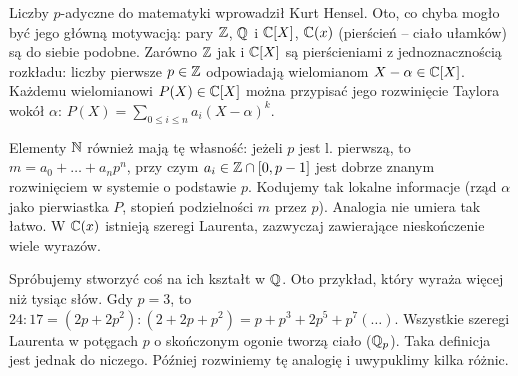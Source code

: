 



Liczby $p$-adyczne do matematyki wprowadził Kurt Hensel.
Oto, co chyba mogło być jego główną motywacją: pary $\mathbb Z$, $\mathbb Q$ i $\mathbb C[X]$, $\mathbb C(x)$ (pierścień -- ciało ułamków) są do siebie podobne.
Zarówno $\mathbb Z$ jak i $\mathbb C[X]$ są pierścieniami z jednoznacznością rozkładu: liczby pierwsze $p \in \mathbb Z$ odpowiadają wielomianom $X - \alpha \in \mathbb C[X]$.
Każdemu wielomianowi $P(X) \in \mathbb C[X]$ można przypisać jego rozwinięcie Taylora wokół $\alpha$: $P(X) = \sum_{0 \le i \le n} a_i (X - \alpha)^k$.

Elementy $\mathbb N$ również mają tę własność: jeżeli $p$ jest l. pierwszą, to $m = a_0 + \ldots + a_n p^n$, przy czym $a_i \in \mathbb Z \cap [0, p-1]$ jest dobrze znanym rozwinięciem w systemie o podstawie $p$.
Kodujemy tak lokalne informacje (rząd $\alpha$ jako pierwiastka $P$, stopień podzielności $m$ przez $p$).
Analogia nie umiera tak łatwo. 
W $\mathbb C(x)$ istnieją szeregi Laurenta, zazwyczaj zawierające nieskończenie wiele wyrazów.

Spróbujemy stworzyć coś na ich kształt w $\mathbb Q$.
Oto przykład, który wyraża więcej niż tysiąc słów.
Gdy $p = 3$, to $24 : 17 = (2p+2p^2) : (2+2p+p^2) = p + p^3 + 2p^5 + p^7(\ldots)$.
Wszystkie szeregi Laurenta w potęgach $p$ o skończonym ogonie tworzą ciało ($\mathbb Q_p$).
Taka definicja jest jednak do niczego.
Później rozwiniemy tę analogię i uwypuklimy kilka różnic.


